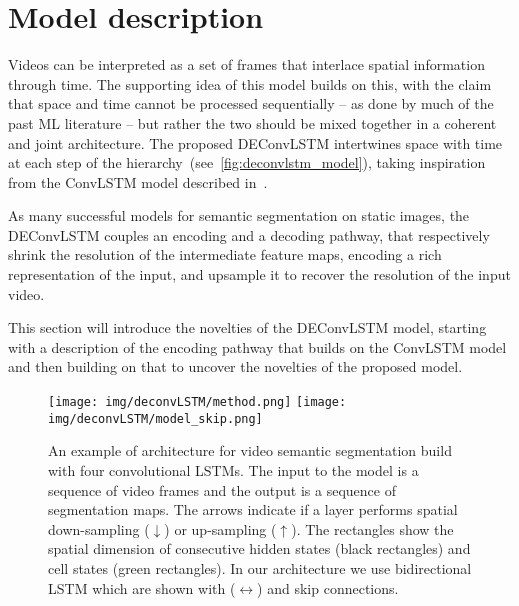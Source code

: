 

\section{Model description}\label{sec:deconvlstm_model}

Videos can be interpreted as a set of frames that interlace spatial information
through time. The supporting idea of this model builds on this, with the claim
that space and time cannot be processed sequentially -- as done by much of the
past ML literature -- but rather the two should be mixed together in a coherent
and joint architecture. The proposed DEConvLSTM intertwines space with time at
each step of the hierarchy~(see~\autoref{fig:deconvlstm_model}), taking
inspiration from the ConvLSTM model described in~\cite{ShiCWYWW15}.

As many successful models for semantic segmentation on static images, the
DEConvLSTM couples an encoding and a decoding pathway, that respectively shrink
the resolution of the intermediate feature maps, encoding a rich representation
of the input, and upsample it to recover the resolution of the input video.

This section will introduce the novelties of the DEConvLSTM model, starting
with a description of the encoding pathway that builds on the ConvLSTM model
and then building on that to uncover the novelties of the proposed model.

\begin{figure}[t]
    \centering
    \texttt{[image: img/deconvLSTM/method.png]}
    \texttt{[image: img/deconvLSTM/model\_skip.png]}
    \caption{An example of architecture for video semantic segmentation build
        with four convolutional LSTMs. The input to the model is a sequence of
        video frames and the output is a sequence of segmentation maps. The
        arrows indicate if a layer performs spatial down-sampling
        ($\downarrow$) or up-sampling ($\uparrow$). The rectangles show the
        spatial dimension of consecutive hidden states (black rectangles) and
        cell states (green rectangles). In our architecture we use
        bidirectional LSTM which are shown with ($\leftrightarrow$) and skip
        connections.}\label{fig:deconvlstm_model}
\end{figure}


